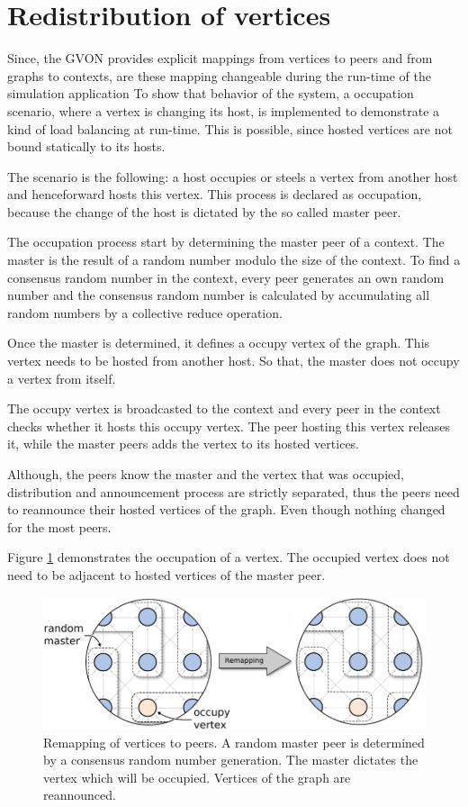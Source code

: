 \section{Redistribution of vertices}

Since, the GVON provides explicit mappings from vertices to peers
and from graphs to contexts, are these mapping changeable during
the run-time of the simulation application
To show that behavior of the system, a occupation scenario, where a
vertex is changing its host, is implemented to demonstrate a kind of load
balancing at run-time. This is possible, since hosted vertices are not
bound statically to its hosts.

The scenario is the following: a host occupies or steels a vertex
from another host and henceforward hosts this vertex.  This process
is declared as occupation, because the change of the host is
dictated by the so called master peer.

The occupation process start by determining the master peer of a
context. The master is the result of a random number modulo the size
of the context. To find a consensus random number in the context,
every peer generates an own random number and the consensus random
number is calculated by accumulating all random numbers by a
collective reduce operation.

Once the master is determined, it defines a occupy vertex of the
graph. This vertex needs to be hosted from another host. So that,
the master does not occupy a vertex from itself.

The occupy vertex is broadcasted to the context and every peer in
the context checks whether it hosts this occupy vertex. The peer
hosting this vertex releases it, while the master peers adds the vertex
to its hosted vertices.

Although, the peers know the master and the vertex that was
occupied, distribution and announcement process are strictly
separated, thus the peers need to reannounce their hosted vertices
of the graph. Even though nothing changed for the most peers.


Figure \ref{fig:gol_remapping} demonstrates the occupation of a
vertex.  The occupied vertex does not need to be adjacent to hosted
vertices of the master peer.

  \begin{figure}[H]
    \centering
    \includegraphics[width=\textwidth]{graphics/40_gol_remapping}
    \caption{Remapping of vertices to peers. A random master peer is
      determined by a consensus random number generation. The master
      dictates the vertex which will be occupied. Vertices of the
      graph are reannounced.}
    \label{fig:gol_remapping}
  \end{figure}



